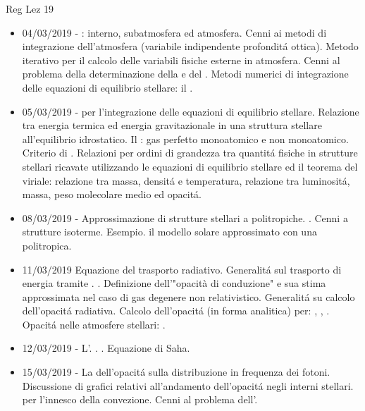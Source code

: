 \begin{frame}[allowframebreaks]{Reg Lez 19}
\begin{itemize}
\item 04/03/2019 - : interno, subatmosfera ed atmosfera. Cenni ai metodi di integrazione dell'atmosfera (variabile indipendente profondit\'a ottica). Metodo iterativo per il calcolo delle variabili fisiche esterne in atmosfera. Cenni al problema della determinazione della  e del . Metodi numerici di integrazione delle equazioni di equilibrio stellare: il . 
\item 05/03/2019 -  per l'integrazione delle equazioni di equilibrio stellare. Relazione tra energia termica ed energia gravitazionale in una struttura stellare all'equilibrio idrostatico. Il : gas perfetto monoatomico e non monoatomico. Criterio di . Relazioni per ordini di grandezza tra quantit\'a fisiche in strutture stellari ricavate utilizzando le equazioni di equilibrio stellare ed il teorema del viriale: relazione tra massa, densit\'a e temperatura, relazione tra luminosit\'a, massa, peso molecolare medio ed opacit\'a. 
\item 08/03/2019 - Approssimazione di strutture stellari a politropiche. . Cenni a strutture isoterme. Esempio. il modello solare approssimato con una politropica. 
\item 11/03/2019 Equazione del trasporto radiativo. Generalit\'a sul trasporto di energia tramite . . Definizione dell'"opacità di conduzione" e sua stima approssimata nel caso di gas degenere non relativistico. Generalit\'a su calcolo dell'opacit\'a radiativa. Calcolo dell'opacit\'a (in forma analitica) per: , , . Opacit\'a nelle atmosfere stellari: . 
\item 12/03/2019 - L'. . . Equazione di Saha.
\item  15/03/2019 - La  dell'opacit\'a sulla distribuzione in frequenza dei fotoni. Discussione di grafici relativi all'andamento dell'opacit\'a negli interni stellari.  per l'innesco della convezione. Cenni al problema dell'.

\end{itemize}
\end{frame}
